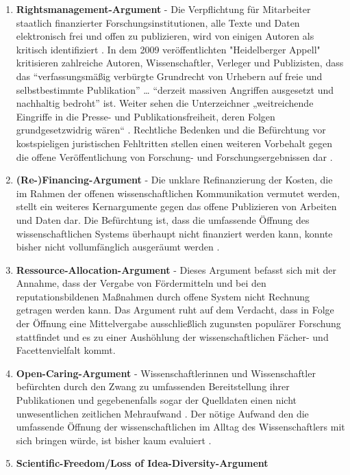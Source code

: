 \begin{enumerate}
\item \textbf{Rightsmanagement-Argument} - Die Verpflichtung für Mitarbeiter staatlich finanzierter Forschungsinstitutionen, alle Texte und Daten elektronisch frei und offen zu publizieren, wird von einigen Autoren als kritisch identifiziert \cite{suchen}. In dem 2009 veröffentlichten "Heidelberger Appell" \cite{faz_heidelberger_apell_2009} kritisieren zahlreiche Autoren, Wissenschaftler, Verleger und Publizisten, dass das “verfassungsmäßig verbürgte Grundrecht von Urhebern auf freie und selbstbestimmte Publikation” … “derzeit massiven Angriffen ausgesetzt und nachhaltig bedroht” ist. Weiter sehen die Unterzeichner „weitreichende Eingriffe in die Presse- und Publikationsfreiheit, deren Folgen grundgesetzwidrig wären“ \cite{ITK_2009}. Rechtliche Bedenken und die Befürchtung vor kostspieligen juristischen Fehltritten stellen einen weiteren Vorbehalt gegen die offene Veröffentlichung von Forschung- und Forschungsergebnissen dar \cite{weishaupt_2009_goldenOA}.
\item \textbf{(Re-)Financing-Argument} - Die unklare Refinanzierung der Kosten, die im Rahmen der offenen wissenschaftlichen Kommunikation vermutet werden, stellt ein weiteres Kernargumente gegen das offene Publizieren von Arbeiten und Daten dar. Die Befürchtung ist, dass die umfassende Öffnung des wissenschaftlichen Systems überhaupt nicht finanziert werden kann, konnte bisher nicht vollumfänglich ausgeräumt werden \cite{weishaupt_2009_goldenOA}.
\item \textbf{Ressource-Allocation-Argument} - Dieses Argument befasst sich mit der Annahme, dass der Vergabe von Fördermitteln und bei den reputationsbildenen Maßnahmen durch offene System nicht Rechnung getragen werden kann. Das Argument ruht auf dem Verdacht, dass in Folge der Öffnung eine Mittelvergabe ausschließlich zugunsten populärer Forschung stattfindet und es zu einer Aushöhlung der wissenschaftlichen Fächer- und Facettenvielfalt kommt.
\item \textbf{Open-Caring-Argument} - Wissenschaftlerinnen und Wissenschaftler befürchten durch den Zwang zu umfassenden Bereitstellung ihrer Publikationen und gegebenenfalls sogar der Quelldaten einen nicht unwesentlichen zeitlichen Mehraufwand \cite{bbaw_publizieren_2015}. Der nötige Aufwand den die umfassende Öffnung der wissenschaftlichen im Alltag des Wissenschaftlers mit sich bringen würde, ist bisher kaum evaluiert \cite{osterloh2008anreize}.
\item \textbf{Scientific-Freedom/Loss of Idea-Diversity-Argument}

\end{enumerate}
